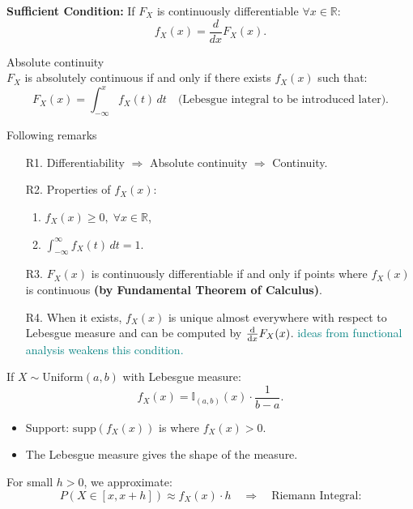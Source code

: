 \textbf{Sufficient Condition:} If \( F_X \) is continuously differentiable \( \forall x \in \mathbb{R} \):
\[
f_X(x) = \frac{d}{dx} F_X(x).
\]

\begin{df}{Absolute continuity}\\
\( F_X \) is absolutely continuous if and only if there exists \( f_X(x) \) such that:
\[
F_X(x) = \int_{-\infty}^x f_X(t) \, dt \quad \text{(Lebesgue integral to be introduced later)}.
\]
\end{df}

\begin{rmk}{Following remarks}
\begin{itemize}
    \item[R1.] Differentiability \( \Rightarrow \) Absolute continuity \( \Rightarrow \) Continuity.
    \item[R2.] Properties of \( f_X(x) \):
    \begin{enumerate}
        \item \( f_X(x) \geq 0, \; \forall x \in \mathbb{R} \),
        \item \( \int_{-\infty}^\infty f_X(t) \, dt = 1 \).
    \end{enumerate}
    \item[R3.] \( F_X(x) \) is continuously differentiable if and only if points where \( f_X(x) \) is continuous \textbf{(by Fundamental Theorem of Calculus)}.
    \item[R4.] When it exists, \( f_X(x) \) is unique almost everywhere with respect to Lebesgue measure and can be computed by $\dv{}{x} F_X(x)$. \textcolor{teal}{ideas from functional analysis weakens this condition.}
\end{itemize}	
\end{rmk}

\begin{eg}{}
If \( X \sim \text{Uniform}(a, b) \) with Lebesgue measure:
\[
f_X(x) = \mathbb{I}_{(a, b)}(x) \cdot \frac{1}{b - a}.
\]
\begin{itemize}
    \item Support: \(\text{supp}(f_X(x))\) is where \( f_X(x) > 0 \).
    \item The Lebesgue measure gives the shape of the measure.
\end{itemize}
\end{eg}

For small \( h > 0 \), we approximate:
\[
P(X \in [x, x+h]) \approx f_X(x) \cdot h \quad \Rightarrow \quad \text{Riemann Integral:}
\]


